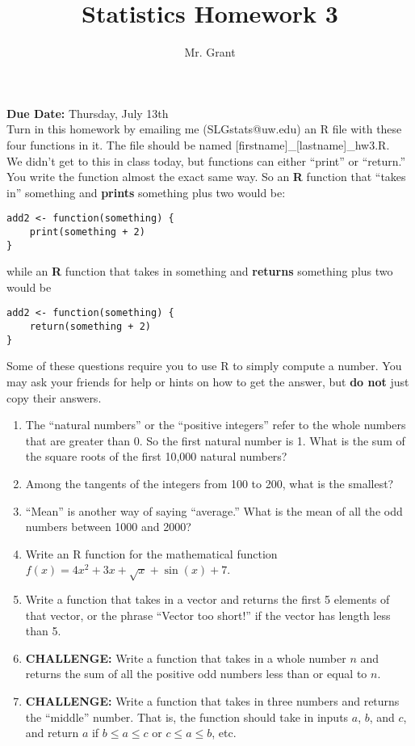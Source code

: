 \documentclass[12pt]{article}
\begin{document}
\title{Statistics Homework 3}
\author{Mr. Grant}
\date{}
\maketitle

\textbf{Due Date:} Thursday, July 13th \\

Turn in this homework by emailing me (SLGstats@uw.edu) an R file with these four functions in it. The file should be named [firstname]\_[lastname]\_hw3.R. \\

We didn't get to this in class today, but functions can either ``print'' or ``return.'' You write the function almost the exact same way. So an \textbf{R} function that ``takes in'' something and \textbf{prints} something plus two would be:
\begin{verbatim}
add2 <- function(something) {
	print(something + 2)
}
\end{verbatim}
while an \textbf{R} function that takes in something and \textbf{returns} something plus two would be
\begin{verbatim}
add2 <- function(something) {
	return(something + 2)
}
\end{verbatim}

Some of these questions require you to use R to simply compute a number. You may ask your friends for help or hints on how to get the answer, but \textbf{do not} just copy their answers.

\begin{enumerate}
	\item{The ``natural numbers'' or the ``positive integers'' refer to the whole numbers that are greater than 0. So the first natural number is 1. What is the sum of the square roots of the first 10,000 natural numbers?}
	\item{Among the tangents of the integers from 100 to 200, what is the smallest?}
	\item{``Mean'' is another way of saying ``average.'' What is the mean of all the odd numbers between 1000 and 2000?}
	\item{Write an R function for the mathematical function $f(x) = 4x^2 + 3x + \sqrt{x} + \sin(x) + 7$.}
	\item{Write a function that takes in a vector and returns the first 5 elements of that vector, or the phrase ``Vector too short!'' if the vector has length less than 5.}
	\item{\textbf{CHALLENGE:} Write a function that takes in a whole number $n$ and returns the sum of all the positive odd numbers less than or equal to $n$.}
	\item{\textbf{CHALLENGE:} Write a function that takes in three numbers and returns the ``middle'' number. That is, the function should take in inputs $a$, $b$, and $c$, and return $a$ if $b \le a \le c$ or $c \le a \le b$, etc.}
\end{enumerate}
\end{document}
